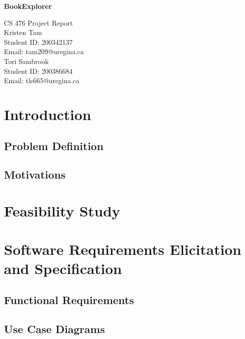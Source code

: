 \documentclass{article}
\begin{document}
\begin{titlepage}

    \centering
    \vspace*{3cm} 
    \huge\bfseries
    BookExplorer
    \vspace{1cm}
   
    \large CS 476 Project Report \\Kristen Tam \\Student ID: 200342137 \\ Email: tam209@uregina.ca \\ 
    \vspace{0.1cm}
    \large Tori Sambrook \\Student ID: 200386684 \\ Email: tls665@uregina.ca
    \vfill

\end{titlepage}

\newpage
\tableofcontents

\newpage
\section{Introduction}
\subsection{Problem Definition}

\subsection{Motivations}

\section{Feasibility Study}

\section{Software Requirements Elicitation and Specification}
\subsection{Functional Requirements}

\subsection{Use Case Diagrams}
\end{document}
